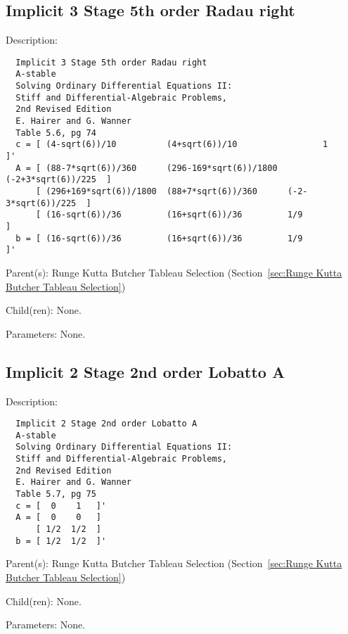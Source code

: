 \subsection{Implicit 3 Stage 5th order Radau right}
\label{sec:Implicit 3 Stage 5th order Radau right}

\begin{list}{}
  {\setlength{\leftmargin}{1.0in}
   \setlength{\labelwidth}{0.75in}
   \setlength{\labelsep}{0.125in}}
  \item[Description:]
\begin{verbatim}
  Implicit 3 Stage 5th order Radau right
  A-stable
  Solving Ordinary Differential Equations II:
  Stiff and Differential-Algebraic Problems,
  2nd Revised Edition
  E. Hairer and G. Wanner
  Table 5.6, pg 74
  c = [ (4-sqrt(6))/10          (4+sqrt(6))/10                 1            ]'
  A = [ (88-7*sqrt(6))/360      (296-169*sqrt(6))/1800  (-2+3*sqrt(6))/225  ]
      [ (296+169*sqrt(6))/1800  (88+7*sqrt(6))/360      (-2-3*sqrt(6))/225  ]
      [ (16-sqrt(6))/36         (16+sqrt(6))/36         1/9                 ]
  b = [ (16-sqrt(6))/36         (16+sqrt(6))/36         1/9                 ]'
\end{verbatim}
  \item[Parent(s):]
    Runge Kutta Butcher Tableau Selection (Section~\ref{sec:Runge Kutta Butcher Tableau Selection})
  \item[Child(ren):]
    None. 
  \item[Parameters:]
    None. 
\end{list}

\subsection{Implicit 2 Stage 2nd order Lobatto A}
\label{sec:Implicit 2 Stage 2nd order Lobatto A}

\begin{list}{}
  {\setlength{\leftmargin}{1.0in}
   \setlength{\labelwidth}{0.75in}
   \setlength{\labelsep}{0.125in}}
  \item[Description:]
\begin{verbatim}
  Implicit 2 Stage 2nd order Lobatto A
  A-stable
  Solving Ordinary Differential Equations II:
  Stiff and Differential-Algebraic Problems,
  2nd Revised Edition
  E. Hairer and G. Wanner
  Table 5.7, pg 75
  c = [  0    1   ]'
  A = [  0    0   ]
      [ 1/2  1/2  ]
  b = [ 1/2  1/2  ]'
\end{verbatim}
  \item[Parent(s):]
    Runge Kutta Butcher Tableau Selection (Section~\ref{sec:Runge Kutta Butcher Tableau Selection})
  \item[Child(ren):]
    None. 
  \item[Parameters:]
    None. 
\end{list}

